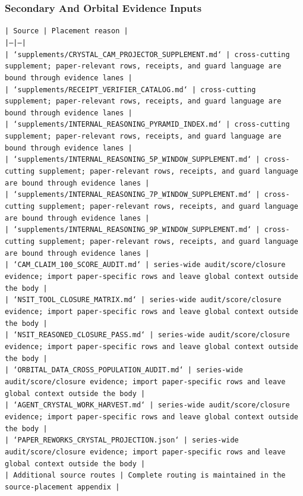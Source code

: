 \documentclass[11pt]{article}
\begin{document}
\subsubsection*{Secondary And Orbital Evidence Inputs}

\noindent\texttt{| Source | Placement reason |}\\
\noindent\texttt{|---|---|}\\
\noindent\texttt{| `supplements/CRYSTAL\_CAM\_PROJECTOR\_SUPPLEMENT.md` | cross-cutting supplement; paper-relevant rows, receipts, and guard language are bound through evidence lanes |}\\
\noindent\texttt{| `supplements/RECEIPT\_VERIFIER\_CATALOG.md` | cross-cutting supplement; paper-relevant rows, receipts, and guard language are bound through evidence lanes |}\\
\noindent\texttt{| `supplements/INTERNAL\_REASONING\_PYRAMID\_INDEX.md` | cross-cutting supplement; paper-relevant rows, receipts, and guard language are bound through evidence lanes |}\\
\noindent\texttt{| `supplements/INTERNAL\_REASONING\_5P\_WINDOW\_SUPPLEMENT.md` | cross-cutting supplement; paper-relevant rows, receipts, and guard language are bound through evidence lanes |}\\
\noindent\texttt{| `supplements/INTERNAL\_REASONING\_7P\_WINDOW\_SUPPLEMENT.md` | cross-cutting supplement; paper-relevant rows, receipts, and guard language are bound through evidence lanes |}\\
\noindent\texttt{| `supplements/INTERNAL\_REASONING\_9P\_WINDOW\_SUPPLEMENT.md` | cross-cutting supplement; paper-relevant rows, receipts, and guard language are bound through evidence lanes |}\\
\noindent\texttt{| `CAM\_CLAIM\_100\_SCORE\_AUDIT.md` | series-wide audit/score/closure evidence; import paper-specific rows and leave global context outside the body |}\\
\noindent\texttt{| `NSIT\_TOOL\_CLOSURE\_MATRIX.md` | series-wide audit/score/closure evidence; import paper-specific rows and leave global context outside the body |}\\
\noindent\texttt{| `NSIT\_REASONED\_CLOSURE\_PASS.md` | series-wide audit/score/closure evidence; import paper-specific rows and leave global context outside the body |}\\
\noindent\texttt{| `ORBITAL\_DATA\_CROSS\_POPULATION\_AUDIT.md` | series-wide audit/score/closure evidence; import paper-specific rows and leave global context outside the body |}\\
\noindent\texttt{| `AGENT\_CRYSTAL\_WORK\_HARVEST.md` | series-wide audit/score/closure evidence; import paper-specific rows and leave global context outside the body |}\\
\noindent\texttt{| `PAPER\_REWORKS\_CRYSTAL\_PROJECTION.json` | series-wide audit/score/closure evidence; import paper-specific rows and leave global context outside the body |}\\
\noindent\texttt{| Additional source routes | Complete routing is maintained in the source-placement appendix |}\\
\end{document}
